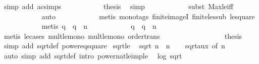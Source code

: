\begin{isabellebody}
\ {\isacharparenleft}simp\ add{\isacharcolon}\ ac{\isacharunderscore}simps{\isacharparenright}\isanewline
\ \ \ \ \ \ \ \ \isamarkupfalse%
\ \isamarkupfalse%
\ {\isacharquery}thesis\ \isamarkupfalse%
\ simp\isanewline
\ \ \ \ \ \ \ \ \ \ \isamarkupfalse%
\ {\isacharparenleft}subst\ Max{\isacharunderscore}le{\isacharunderscore}iff{\isacharparenright}\isanewline
\ \ \ \ \ \ \ \ \ \ \isamarkupfalse%
\ auto\isanewline
\ \ \ \ \ \ \ \ \ \ \isamarkupfalse%
\ {\isacharparenleft}metis\ {\isacharparenleft}mono{\isacharunderscore}tags{\isacharparenright}\ finite{\isacharunderscore}imageI\ finite{\isacharunderscore}less{\isacharunderscore}ub\ le{\isacharunderscore}square{\isacharparenright}\isanewline
\ \ \ \ \ \ \ \ \ \ \isamarkupfalse%
\ {\isacharparenleft}metis\ {\isacharbackquoteopen}q\ {\isacharasterisk}\ q\ {\isasymle}\ n{\isacharbackquoteclose}{\isacharparenright}\isanewline
\ \ \ \ \ \ \ \ \ \ \isamarkupfalse%
\ {\isacharbackquoteopen}q\ {\isacharasterisk}\ q\ {\isasymle}\ n{\isacharbackquoteclose}\ \isamarkupfalse%
\ {\isacharparenleft}metis\ le{\isacharunderscore}cases\ mult{\isacharunderscore}le{\isacharunderscore}mono{}\ mult{\isacharunderscore}le{\isacharunderscore}mono{}\ order{\isacharunderscore}trans{\isacharparenright}\isanewline
\ \ \ \ \ \ \isamarkupfalse%
\isanewline
\ \ \ \ \isamarkupfalse%
\isanewline
\ \ \isamarkupfalse%
\ {\isacharasterisk}\ \isamarkupfalse%
\ {\isacharquery}thesis\ \isamarkupfalse%
\ {\isacharparenleft}simp\ add{\isacharcolon}\ sqrt{\isacharunderscore}def\ power{}{\isacharunderscore}eq{\isacharunderscore}square{\isacharparenright}\isanewline
{}\isamarkupfalse%
%
\endisatagproof
{\isafoldproof}%
%
\isadelimproof
\isanewline
%
\endisadelimproof
\isanewline
{}\isamarkupfalse%
\ sqrt{\isacharunderscore}le{\isacharcolon}\isanewline
\ \ {\isachardoublequoteopen}sqrt\ n\ {\isasymle}\ n{\isachardoublequoteclose}\isanewline
%
\isadelimproof
\ \ %
\endisadelimproof
%
\isatagproof
{}\isamarkupfalse%
\ sqrt{\isacharunderscore}aux\ {\isacharbrackleft}of\ n{\isacharbrackright}\ \isamarkupfalse%
\ {\isacharparenleft}auto\ simp\ add{\isacharcolon}\ sqrt{\isacharunderscore}def\ intro{\isacharcolon}\ power{}{\isacharunderscore}nat{\isacharunderscore}le{\isacharunderscore}imp{\isacharunderscore}le{\isacharparenright}%
\endisatagproof
{\isafoldproof}%
%
\isadelimproof
\isanewline
%
\endisadelimproof
\isanewline
{}\isamarkupfalse%
\ {\isacharparenleft}\ log\ sqrt\isanewline
%
\isadelimtheory
\isanewline
%
\endisadelimtheory
%
\isatagtheory
{}\isamarkupfalse%
%
\endisatagtheory
{\isafoldtheory}%
%
\isadelimtheory
%
\endisadelimtheory
\end{isabellebody}%
